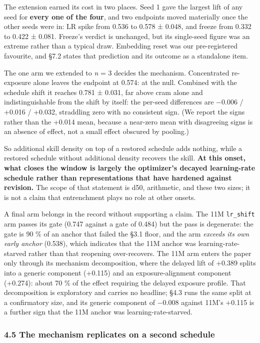 \documentclass[11pt]{article}
\begin{document}
The extension earned its cost in two places. Seed 1 gave the largest lift of any seed for
\textbf{every one of the four}, and two endpoints moved materially once the other seeds were in:
LR spike from 0.536 to 0.578 ± 0.048, and freeze from 0.332 to 0.422 ± 0.081. Freeze's
verdict is unchanged, but its single-seed figure was an extreme rather than a typical draw.
Embedding reset was our pre-registered favourite, and §7.2 states that prediction and its
outcome as a standalone item.

The one arm we extended to \emph{n} = 3 decides the mechanism. Concentrated re-exposure alone
leaves the endpoint at 0.574: at the null. Combined with the schedule shift it reaches
0.781 ± 0.031, far above cram alone and indistinguishable from the shift by itself: the
per-seed differences are −0.006 / +0.016 / +0.032, straddling zero with no consistent sign.
(We report the signs rather than the +0.014 mean, because a near-zero mean with disagreeing
signs is an absence of effect, not a small effect obscured by pooling.)

So additional skill density on top of a restored schedule adds nothing, while a restored
schedule without additional density recovers the skill. \textbf{At this onset, what closes the
window is largely the optimizer's decayed learning-rate schedule rather than representations
that have hardened against revision.} The scope of that statement is d50, arithmetic, and
these two sizes; it is not a claim that entrenchment plays no role at other onsets.

A final arm belongs in the record without supporting a claim. The 11M \texttt{lr\_shift} arm passes
its gate (0.747 against a gate of 0.484) but the pass is degenerate: the gate is 90 \% of an
anchor that failed the §3.1 floor, and the arm \emph{exceeds its own early anchor} (0.538),
which indicates that the 11M anchor was learning-rate-starved rather than that reopening
over-recovers. The 11M arm enters the paper only through its mechanism decomposition, where
the delayed lift of +0.389 splits into a generic component (+0.115) and an
exposure-alignment component (+0.274): about 70 \% of the effect requiring the delayed
exposure profile. That decomposition is exploratory and carries no headline; §4.3 runs the
same split at a confirmatory size, and its generic component of −0.008 against 11M's +0.115
is a further sign that the 11M anchor was learning-rate-starved.

\subsubsection{4.5 The mechanism replicates on a second schedule}\label{the-mechanism-replicates-on-a-second-schedule}
\end{document}
